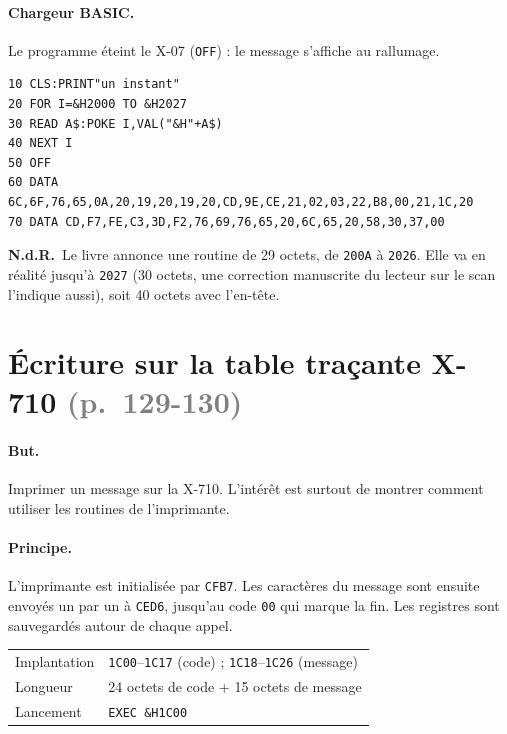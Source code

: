 \documentclass[a4paper,10pt]{article}
\makeatletter
\newcommand{\hex}[1]{\texttt{#1}}
\newcommand{\pg}[1]{\texorpdfstring{\textcolor{gray}{\small(p.~#1)}}{}}
\newcommand{\nota}[1]{\textcolor{red!60!black}{\small\textbf{N.d.R.}~#1}}
\newcommand{\fiche}[3]{%
  \begin{center}\small
  \begin{tabular}{@{}ll@{}}
  \toprule
  Implantation & #1 \\
  Longueur & #2 \\
  Lancement & #3 \\
  \bottomrule
  \end{tabular}
  \end{center}}
\makeatother
\begin{document}
\paragraph{Chargeur BASIC.} Le programme éteint le X-07 (\texttt{OFF}) :
le message s'affiche au rallumage.
\begin{verbatim}
10 CLS:PRINT"un instant"
20 FOR I=&H2000 TO &H2027
30 READ A$:POKE I,VAL("&H"+A$)
40 NEXT I
50 OFF
60 DATA 6C,6F,76,65,0A,20,19,20,19,20,CD,9E,CE,21,02,03,22,B8,00,21,1C,20
70 DATA CD,F7,FE,C3,3D,F2,76,69,76,65,20,6C,65,20,58,30,37,00
\end{verbatim}

\nota{Le livre annonce une routine de 29 octets, de \hex{200A} à
\hex{2026}. Elle va en réalité jusqu'à \hex{2027} (30 octets, une
correction manuscrite du lecteur sur le scan l'indique aussi), soit 40
octets avec l'en-tête.}

\section{Écriture sur la table traçante X-710 \pg{129-130}}

\paragraph{But.} Imprimer un message sur la X-710. L'intérêt est surtout de
montrer comment utiliser les routines de l'imprimante.

\paragraph{Principe.} L'imprimante est initialisée par \hex{CFB7}. Les
caractères du message sont ensuite envoyés un par un à \hex{CED6}, jusqu'au
code \hex{00} qui marque la fin. Les registres sont sauvegardés autour de
chaque appel.

\fiche{\hex{1C00}--\hex{1C17} (code) ; \hex{1C18}--\hex{1C26} (message)}%
      {24 octets de code + 15 octets de message}{\texttt{EXEC \&H1C00}}
\end{document}

